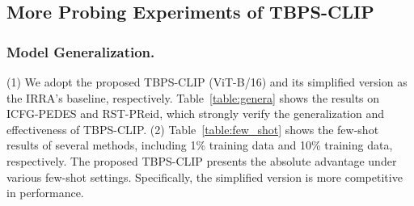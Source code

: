 \documentclass[letterpaper]{article} %
\begin{document}

\subsection{More Probing Experiments of TBPS-CLIP}

\subsubsection{Model Generalization.}
(1) We adopt the proposed TBPS-CLIP (ViT-B/16) and its simplified version as the IRRA's baseline, respectively.
Table~\ref{table:genera} shows the results on ICFG-PEDES and RST-PReid, which strongly verify the generalization and effectiveness of TBPS-CLIP.
(2) Table~\ref{table:few_shot} shows the few-shot results of several methods, including 1\% training data and 10\% training data, respectively.
The proposed TBPS-CLIP presents the absolute advantage under various few-shot settings.
Specifically, the simplified version is more competitive in performance.

\begin{table}
\setlength{\abovecaptionskip}{-0.01cm}
\begin{center}
{\caption{Results for applying the proposed TBPS-CLIP as the baseline of other method. The mean Inverse Negative Penalty(mINP) metric is used in IRRA and also adopted here for comparison.}\label{table:genera}}
\end{center}
\vspace{-0.1cm}
\end{table}
\end{document}
